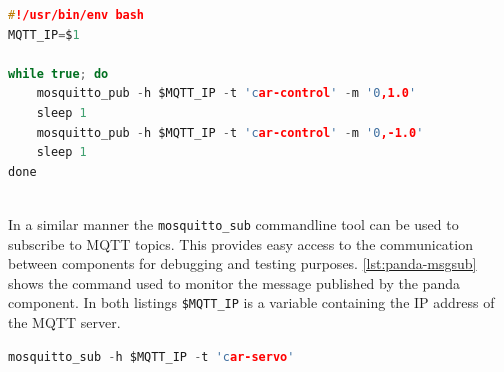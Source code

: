 \begin{minipage}{\linewidth}
\begin{lstlisting}[style=mylistings, language=c, label=lst:panda-msgpub, caption=Injecting steering commands over MQTT]
#!/usr/bin/env bash
MQTT_IP=$1

while true; do
	mosquitto_pub -h $MQTT_IP -t 'car-control' -m '0,1.0'
	sleep 1
	mosquitto_pub -h $MQTT_IP -t 'car-control' -m '0,-1.0'
	sleep 1
done
\end{lstlisting}
\end{minipage} \\

In a similar manner the \texttt{mosquitto\_sub} commandline tool can be used to subscribe to MQTT topics. This provides easy access to the communication between components for debugging and testing purposes.
\autoref{lst:panda-msgsub} shows the command used to monitor the message published by the panda component. In both listings \texttt{\$MQTT\_IP} is a variable containing the IP address of the MQTT server. \\

\begin{minipage}{\linewidth}
\begin{lstlisting}[style=mylistings, language=c, label=lst:panda-msgsub, caption=Subscribing to MQTT topics]
mosquitto_sub -h $MQTT_IP -t 'car-servo'
\end{lstlisting}
\end{minipage} \\
